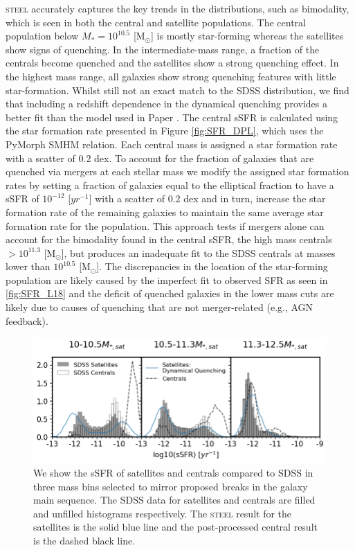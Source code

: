 \textsc{steel} accurately captures the key trends in the distributions, such as bimodality, which is seen in both the central and satellite populations. The central population below $M_{*} = 10^{10.5}$ [M$_{\odot}$] is mostly star-forming whereas the satellites show signs of quenching. In the intermediate-mass range, a fraction of the centrals become quenched and the satellites show a strong quenching effect. In the highest mass range, all galaxies show strong quenching features with little star-formation. Whilst still not an exact match to the SDSS distribution, we find that including a redshift dependence in the dynamical quenching provides a better fit than the model used in Paper . The central sSFR is calculated using the star formation rate presented in Figure \ref{fig:SFR_DPL}, which uses the PyMorph SMHM relation. Each central mass is assigned a star formation rate with a scatter of 0.2 dex. To account for the fraction of galaxies that are quenched via mergers at each stellar mass we modify the assigned star formation rates by setting a fraction of galaxies equal to the elliptical fraction to have a sSFR of $10^{-12}$ [$yr^{-1}$] with a scatter of 0.2 dex and in turn, increase the star formation rate of the remaining galaxies to maintain the same average star formation rate for the population. This approach tests if mergers alone can account for the bimodality found in the central sSFR, the high mass centrals $ > 10^{11.3}$ [M$_{\odot}$], but produces an inadequate fit to the SDSS centrals at masses lower than $10^{10.5}$ [M$_{\odot}$]. The discrepancies in the location of the star-forming population are likely caused by the imperfect fit to observed SFR as seen in \ref{fig:SFR_L18} and the deficit of quenched galaxies in the lower mass cuts are likely due to causes of quenching that are not merger-related (e.g., AGN feedback).

\begin{figure}[h]
    \centering
    \includegraphics[width = \linewidth]{Figures/Chapter4/SSFR.png}
    \caption{We show the sSFR of satellites and centrals compared to SDSS in three mass bins selected to mirror proposed breaks in the galaxy main sequence. The SDSS data for satellites and centrals are filled and unfilled histograms respectively. The \textsc{steel} result for the satellites is the solid blue line and the post-processed central result is the dashed black line.}
    \label{fig:sSFR}
\end{figure}

